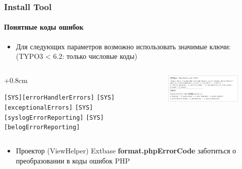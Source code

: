 
\begin{frame}[fragile]
	\frametitle{Install Tool}
	\framesubtitle{Понятные коды ошибок}

	\begin{itemize}
		\item Для следующих параметров возможно использовать значимые ключи:\newline
			(TYPO3 < 6.2: только числовые коды)
	\end{itemize}

	\begin{columns}[T]
		\begin{column}{.4\textwidth}
			\advance\leftskip+0.8cm

			\smaller
				\texttt{[SYS][errorHandlerErrors]}\newline
				\texttt{[SYS][exceptionalErrors]}\newline
				\texttt{[SYS][syslogErrorReporting]}\newline
				\texttt{[SYS][belogErrorReporting]}\newline
			\normalsize

		\end{column}
		\begin{column}{.6\textwidth}

			\begin{figure}\vspace*{-0.4cm}
				\includegraphics[width=0.9\linewidth]{Images/InstallTool/HumanFriendlyErrorCodes.png}
			\end{figure}

		\end{column}
	\end{columns}

	\vspace{0.2cm}

	\begin{itemize}
		\item Проектор (ViewHelper) Extbase \textbf{format.phpErrorCode} заботиться о преобразовании в коды ошибок PHP
	\end{itemize}

\end{frame}


